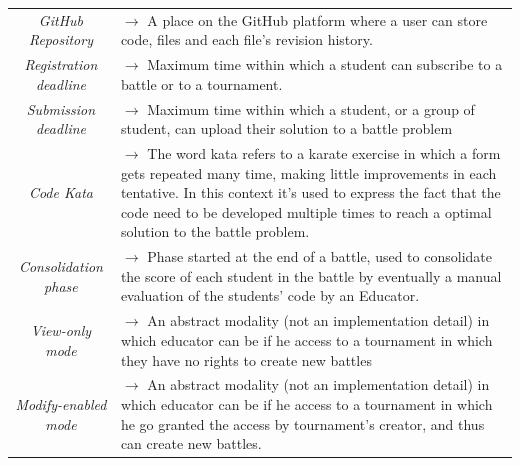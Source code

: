 \documentclass{article}
\begin{document}
{\begin{xltabular}{\textwidth}{ >{\raggedright\arraybackslash}c >{\raggedright\arraybackslash}X }
                \textit{GitHub Repository} & $\rightarrow$ A place on the GitHub platform where a user can store code, files and each file's revision history. \\
                \textit{Registration deadline} & $\rightarrow$ Maximum time within which a student can subscribe to a battle or to a tournament. \\
                \textit{Submission deadline} & $\rightarrow$ Maximum time within which a student, or a group of student, can upload their solution to a battle problem \\
                \textit{Code Kata} & $\rightarrow$ The word kata refers to a karate exercise in which a form gets repeated many time, making little improvements in each tentative.
                In this context it's used to express the fact that the code need to be developed multiple times to reach a optimal solution to the battle problem. \\
                \textit{Consolidation phase} & $\rightarrow$ Phase started at the end of a battle, used to consolidate the score of each student in the battle by eventually a manual evaluation of the students' code by an Educator. \\
                \textit{View-only mode} & $\rightarrow$ An abstract modality (not an implementation detail) in which educator can be if he access to a tournament in which they have no rights to create new battles \\
                \textit{Modify-enabled mode }& $\rightarrow$ An abstract modality (not an implementation detail) in which educator can be if he access to a tournament in which he go granted the access by tournament's creator, and thus can create new battles.
            \end{xltabular}
    
}
\end{document}
